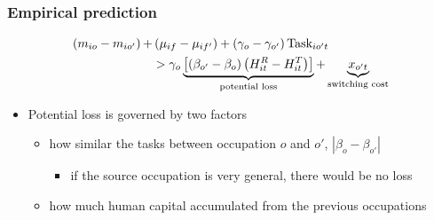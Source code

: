 \documentclass[11pt]{beamer}
\begin{document}
\begin{frame}
	\frametitle{Empirical prediction}
	
\begin{align}	\label{eq:eq10}
	\left(m_{io}-m_{io'} \right) + &\left( \mu_{if}-\mu_{if'}\right)+\left( \gamma_o-\gamma_{o'}\right) \text{Task}_{io't} \\
	&>\gamma_o\underbrace{\left[ \left( \beta_{o'} - \beta_{o}\right) \left( H_{it}^R-H_{it}^T\right) \right]}_{\text{potential loss}} +  \underbrace{x_{o't}}_{\text{switching cost}} \notag
\end{align}
	
	\begin{itemize}
		\item Potential loss is governed by two factors
		\vspace{1 mm}
		\begin{itemize}
			\item how similar the tasks between occupation $o$ and $o'$, $|\beta_o-\beta_{o'}|$
			\begin{itemize}
				\item if the source occupation is very general, there would be no loss
			\end{itemize}
		\vspace{1 mm}
			\item how much human capital accumulated from the previous occupations
		\end{itemize}
	
	\end{itemize}
\end{frame}
\end{document}
